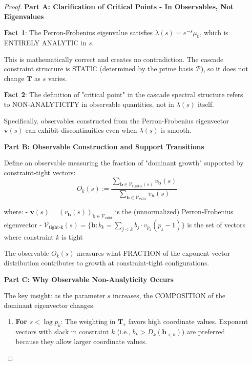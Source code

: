 \begin{proof}

\noindent \textbf{Part A: Clarification of Critical Points - In Observables, Not Eigenvalues}

\textbf{Fact 1}: The Perron-Frobenius eigenvalue satisfies $\lambda(s) = e^{-s} \mu_0$, which is ENTIRELY ANALYTIC in $s$.

This is mathematically correct and creates no contradiction. The cascade constraint structure is STATIC (determined by the prime basis $\mathcal{P}$), so it does not change $\mathbf{T}$ as $s$ varies.

\textbf{Fact 2}: The definition of "critical point" in the cascade spectral structure refers to NON-ANALYTICITY in observable quantities, not in $\lambda(s)$ itself.

Specifically, observables constructed from the Perron-Frobenius eigenvector $\mathbf{v}(s)$ can exhibit discontinuities even when $\lambda(s)$ is smooth.

\noindent \textbf{Part B: Observable Construction and Support Transitions}

Define an observable measuring the fraction of "dominant growth" supported by constraint-tight vectors:
\begin{equation}
O_k(s) := \frac{\sum_{\mathbf{b} \in \mathcal{V}_{\text{tight-k}}(s)} v_{\mathbf{b}}(s)}{\sum_{\mathbf{b} \in \mathcal{V}_{\text{valid}}} v_{\mathbf{b}}(s)}
\end{equation}

where:
- $\mathbf{v}(s) = (v_{\mathbf{b}}(s))_{\mathbf{b} \in \mathcal{V}_{\text{valid}}}$ is the (unnormalized) Perron-Frobenius eigenvector
- $\mathcal{V}_{\text{tight-k}}(s) = \{\mathbf{b} : b_k = \sum_{j < k} b_j \cdot v_{p_k}(p_j-1)\}$ is the set of vectors where constraint $k$ is tight

The observable $O_k(s)$ measures what FRACTION of the exponent vector distribution contributes to growth at constraint-tight configurations.

\noindent \textbf{Part C: Why Observable Non-Analyticity Occurs}

The key insight: as the parameter $s$ increases, the COMPOSITION of the dominant eigenvector changes.

\begin{enumerate}

\item \textbf{For $s < \log p_k$}: The weighting in $\mathbf{T}_s$ favors high coordinate values. Exponent vectors with slack in constraint $k$ (i.e., $b_k > D_k(\mathbf{b}_{<k})$) are preferred because they allow larger coordinate values.


\end{enumerate}
\end{proof}
